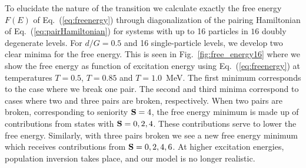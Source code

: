 \documentclass{elsart}
\begin{document}
To elucidate the nature of the transition
we calculate exactly the  
free energy $F(E)$ of Eq.~(\ref{eq:freenergy})
through diagonalization of the pairing Hamiltonian of 
Eq.~(\ref{eq:pairHamiltonian})
for systems with up to 16 particles in $16$ doubly degenerate
levels. 
For $d/G=0.5$ and 16 single-particle levels, 
we develop two clear  minima for the free energy.
This is seen in
Fig.~\ref{fig:free_energy16} where we show the free energy as function of 
excitation energy
using Eq.~(\ref{eq:freenergy}) at temperatures 
$T=0.5$, $T=0.85$ and $T=1.0$~MeV.
The first minimum corresponds to the case where we break one pair.
The second and third minima  correspond
to cases where two and three pairs are broken, respectively. 
When two pairs are broken, corresponding to seniority ${\bf S}=4$, 
the free energy minimum is made up of contributions
from states with ${\bf S}=0,2,4$. These contributions serve to lower
the free energy. 
Similarly, with three pairs
broken we see a new free energy minimum which receives contributions
from ${\bf S}=0,2,4,6$.
At higher excitation energies, population
inversion takes place, and our model is no longer realistic. 
\end{document}
